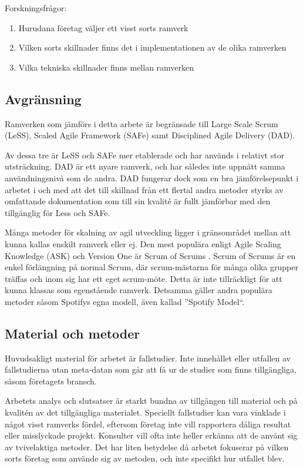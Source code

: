 		Forskningsfrågor:
		\begin{enumerate}
			\item Hurudana företag väljer ett visst sorts ramverk
			\item Vilken sorts skillnader finns det i implementationen av de olika ramverken
			\item Vilka tekniska skillnader finns mellan ramverken
		\end{enumerate}
			
	
	\subsection{Avgränsning}
	
		Ramverken som jämförs i detta arbete är begränsade till Large Scale Scrum (LeSS), Scaled Agile Framework (SAFe) samt Disciplined Agile Delivery (DAD).
		
		Av dessa tre är LeSS och SAFe mer etablerade och har används i relativt stor utsträckning. DAD är ett nyare ramverk, och har således inte uppnått samma användningsnivå som de andra. DAD fungerar dock som en bra jämförelsepunkt i arbetet i och med att det till skillnad från ett flertal andra metoder styrks av omfattande dokumentation som till sin kvalité är fullt jämförbar med den tillgänglig för Less och SAFe.
		\cite{ask_matrix}
		
		Många metoder för skalning av agil utveckling ligger i gränsområdet mellan att kunna kallas enskilt ramverk eller ej. Den mest populära enligt Agile Scaling Knowledge (ASK) och Version One är Scrum of Scrums \cite{ask_matrix} \cite{version_one_report}. Scrum of Scrums är en enkel förlängning på normal Scrum, där scrum-mästarna för många olika grupper träffas och inom sig har ett eget scrum-möte. Detta är inte tillräckligt för att kunna klassas som egenstående ramverk. Detsamma gäller andra populära metoder såsom Spotifys egna modell, även kallad ''Spotify Model``.
		
	\subsection{Material och metoder}
		
		Huvudsakligt material för arbetet är fallstudier. Inte innehållet eller utfallen av fallstudierna utan meta-datan som går att få ur de studier som finns tillgängliga, såsom företagets bransch.
				
		Arbetets analys och slutsatser är starkt bundna av tillgången till material och på kvalitén av det tillgängliga materialet. Speciellt fallstudier kan vara vinklade i något visst ramverks fördel, eftersom företag inte vill rapportera dåliga resultat eller misslyckade projekt. Konsulter vill ofta inte heller erkänna att de använt sig av tvivelaktiga metoder.
		Det har liten betydelse då arbetet fokuserar på vilken sorts företag som använde sig av metoden, och inte specifikt hur utfallet blev.
		
